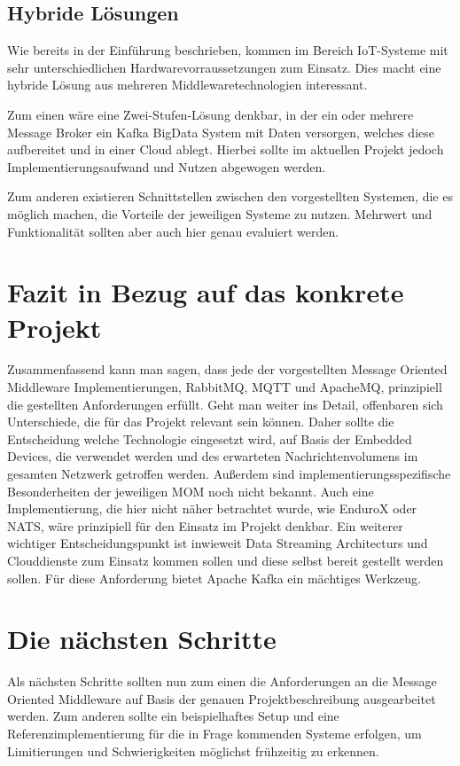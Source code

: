 \documentclass[conference, ngerman]{IEEEtran}
\begin{document}
\subsection{Hybride Lösungen}\label{test}
Wie bereits in der Einführung beschrieben, kommen im Bereich IoT-Systeme mit sehr unterschiedlichen Hardwarevorraussetzungen zum Einsatz. Dies macht eine hybride Lösung aus mehreren Middlewaretechnologien interessant. 

Zum einen wäre eine Zwei-Stufen-Lösung denkbar, in der ein oder mehrere Message Broker ein Kafka BigData System mit Daten versorgen, welches diese aufbereitet und in einer Cloud ablegt. Hierbei sollte im aktuellen Projekt jedoch Implementierungsaufwand und Nutzen abgewogen werden. 

Zum anderen existieren Schnittstellen zwischen den vorgestellten Systemen, die es möglich machen, die Vorteile der jeweiligen Systeme zu nutzen. Mehrwert und Funktionalität sollten aber auch hier genau evaluiert werden.

\section{Fazit in Bezug auf das konkrete Projekt}
Zusammenfassend kann man sagen, dass jede der vorgestellten Message Oriented Middleware Implementierungen, RabbitMQ, MQTT und ApacheMQ, prinzipiell die gestellten Anforderungen erfüllt\cite{ExplMessBrok}. Geht man weiter ins Detail, offenbaren sich Unterschiede, die für das Projekt relevant sein können. Daher sollte die Entscheidung welche Technologie eingesetzt wird, auf Basis der Embedded Devices, die verwendet werden und des erwarteten Nachrichtenvolumens im gesamten Netzwerk getroffen werden. Außerdem sind implementierungsspezifische Besonderheiten der jeweiligen MOM noch nicht bekannt. Auch eine Implementierung, die hier nicht näher betrachtet wurde, wie EnduroX oder NATS, wäre prinzipiell für den Einsatz im Projekt denkbar.  Ein weiterer wichtiger Entscheidungspunkt ist inwieweit Data Streaming Architecturs und Clouddienste zum Einsatz kommen sollen und diese selbst bereit gestellt werden sollen. Für diese Anforderung bietet Apache Kafka ein mächtiges Werkzeug.

\section{Die nächsten Schritte}
Als nächsten Schritte sollten nun zum einen die Anforderungen an die Message Oriented Middleware auf Basis der genauen Projektbeschreibung ausgearbeitet werden. Zum anderen sollte ein beispielhaftes Setup und eine Referenzimplementierung für die in Frage kommenden Systeme erfolgen, um Limitierungen und Schwierigkeiten möglichst frühzeitig zu erkennen.
\cite{estrada2015comparing}
\end{document}
